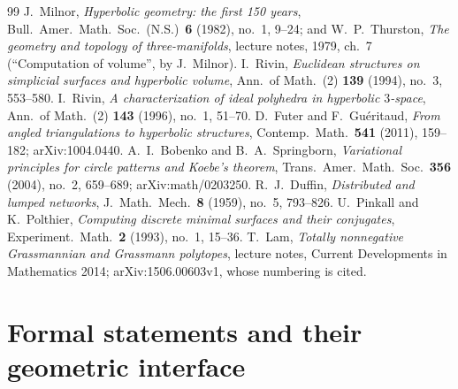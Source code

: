 \documentclass[11pt]{article}
\theoremstyle{definition}
\begin{document}
\begin{thebibliography}{99}
 J.~Milnor, \emph{Hyperbolic geometry: the first 150 years},
  Bull.\ Amer.\ Math.\ Soc.\ (N.S.)\ \textbf{6} (1982), no.~1, 9--24; and
  W.~P.~Thurston, \emph{The geometry and topology of three-manifolds}, lecture notes,
  1979, ch.~7 (``Computation of volume'', by J.~Milnor).
 I.~Rivin, \emph{Euclidean structures on simplicial surfaces and hyperbolic volume},
  Ann.\ of Math.\ (2) \textbf{139} (1994), no.~3, 553--580.
 I.~Rivin, \emph{A characterization of ideal polyhedra in hyperbolic $3$-space},
  Ann.\ of Math.\ (2) \textbf{143} (1996), no.~1, 51--70.
 D.~Futer and F.~Gu\'eritaud, \emph{From angled triangulations to hyperbolic
  structures}, Contemp.\ Math.\ \textbf{541} (2011), 159--182; arXiv:1004.0440.
 A.~I.~Bobenko and B.~A.~Springborn, \emph{Variational principles for circle
  patterns and Koebe's theorem}, Trans.\ Amer.\ Math.\ Soc.\ \textbf{356} (2004), no.~2, 659--689;
  arXiv:math/0203250.
 R.~J.~Duffin, \emph{Distributed and lumped networks}, J.\ Math.\ Mech.\ \textbf{8}
  (1959), no.~5, 793--826.
 U.~Pinkall and K.~Polthier, \emph{Computing discrete minimal surfaces and
  their conjugates}, Experiment.\ Math.\ \textbf{2} (1993), no.~1, 15--36.
 T.~Lam, \emph{Totally nonnegative Grassmannian and Grassmann polytopes}, lecture notes, Current Developments in Mathematics 2014; arXiv:1506.00603v1, whose numbering is cited.
\end{thebibliography}

\appendix
\section{Formal statements and their geometric interface}\label{app:lean-interface}
\end{document}
